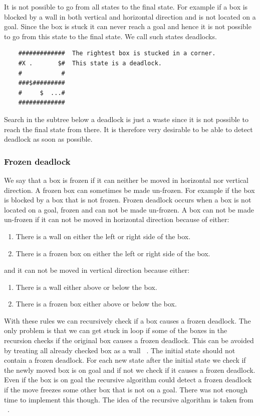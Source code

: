 \documentclass[a4paper,10pt]{article}
\begin{document}
	It is not possible to go from all states to the final state.  
	For example if a box is blocked by a wall in both vertical and horizontal direction and is not located on a goal.  
	Since the box is stuck it can never reach a goal and hence it is not possible to go from this state to the final state.    
	We call such states deadlocks.

	\begin{verbatim}
	#############  The rightest box is stucked in a corner.
	#X .       $#  This state is a deadlock.
	#           # 
	###$######### 
	#     $  ...# 
	############# 
	\end{verbatim}

        Search in the subtree below a deadlock is just a waste since it is not possible to reach the final state from there.  
        It is therefore very desirable to be able to detect deadlock as soon as possible.
	  \subsubsection{Frozen deadlock}
	    We say that a box is frozen if it can neither be moved in horizontal nor vertical direction.  
	    A frozen box can sometimes be made un-frozen.  For example if the box is blocked by a box that is not frozen.  
	    Frozen deadlock occurs when a box is not located on a goal, frozen and can not be made un-frozen.  
	    A box can not be made un-frozen if it can not be moved in horizontal direction because of either:
	
	    \begin{enumerate}[I]
                \item There is a wall on either the left or right side of the box.
                \item There is a frozen box on either the left or right side of the box.
            \end{enumerate}
            and it can not be moved in vertical direction because either: 
            \begin{enumerate}[I]
                \item There is a wall either above or below the box.
                \item There is a frozen box either above or below the box.
            \end{enumerate}
            With these rules we can recursively check if a box causes a frozen deadlock.  
            The only problem is that we can get stuck in loop if some of the boxes in the recursion checks if the original box causes a frozen deadlock.  
            This can be avoided by treating all already checked box as a wall ~\cite{frozen_deadlock}.    
            The initial state should not contain a frozen deadlock.  
            For each new state after the initial state we check if the newly moved box is on goal and if not we check if it causes a frozen deadlock. 
            Even if the box is on goal the recursive algorithm could detect a frozen deadlock if the move freezes some other box that is not on a goal.  
            There was not enough time to implement this though.  
            The idea of the recursive algorithm is taken from  ~\cite{frozen_deadlock}.
\end{document}
